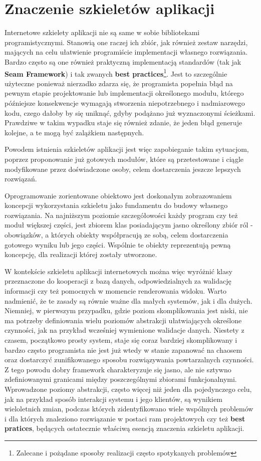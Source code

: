 \section{Znaczenie szkieletów aplikacji}
	Internetowe szkielety aplikacji nie są same w sobie bibliotekami programistycznymi. Stanowią one raczej ich zbiór, jak również zestaw narzędzi, mających na celu ułatwienie programiście implementacji własnego rozwiązania. Bardzo często są one również praktyczną implementacją standardów (tak jak \textbf{Seam Framework}) i tak zwanych \textbf{best practices}\footnote{Zalecane i pożądane sposoby realizacji często spotykanych problemów}. Jest to szczególnie użyteczne ponieważ nierzadko zdarza się, że programista popełnia błąd na pewnym etapie projektowanie lub implementacji określonego modułu, którego późniejsze konsekwencje wymagają stworzenia niepotrzebnego i nadmiarowego kodu, czego dałoby by się uniknąć, gdyby podążano już wyznaczonymi ścieżkami. Prawdziwe w takim wypadku staje się również zdanie, że jeden błąd generuje kolejne, a te mogą być zalążkiem następnych.
	
	Powodem istnienia szkieletów aplikacji jest więc zapobieganie takim sytuacjom, poprzez proponowanie już gotowych modułów, które są przetestowane i ciągle modyfikowane przez doświadczone osoby, celem dostarczenia jeszcze lepszych rozwiązań\cite{art_of_java_web_dev}.
	
	Oprogramowanie zorientowane obiektowo jest doskonałym zobrazowaniem koncepcji wykorzystania szkieletu jako fundamentu do budowy własnego rozwiązania. Na najniższym poziomie szczegółowości każdy program czy też moduł większej części, jest zbiorem klas posiadającym jasno określony zbiór ról - obowiązków, a których obiekty współpracują ze sobą, celem dostarczenia gotowego wyniku lub jego części. Wspólnie te obiekty reprezentują pewną koncepcję, dla realizacji której zostały utworzone. 
	
	W kontekście szkieletu aplikacji internetowych można więc wyróżnić klasy przeznaczone do kooperacji z bazą danych, odpowiedzialnych za walidację informacji czy też pomocnych w momencie renderowania widoku. Warto nadmienić, że te zasady są równie ważne dla małych systemów, jak i dla dużych. Niemniej, w pierwszym przypadku, gdzie poziom skomplikowania jest niski, nie ma potrzeby definiowania wielu poziomów abstrakcji ułatwiających określone czynności, jak na przykład wcześniej wymienione walidacje danych. Niestety z czasem, początkowo prosty system, staje się coraz bardziej skomplikowany i bardzo często programista nie jest już wtedy w stanie zapanować na chaosem oraz dostarczyć zunifikowanego sposobu rozwiązywania powtarzalnych czynności. Z tego powodu dobry framework charakteryzuje się jasno, ale nie sztywno zdefiniowanymi granicami między poszczególnymi zbiorami funkcjonalnymi. Wprowadzone poziomy abstrakcji, często więcej niż jeden dla pojedynczego celu, jak na przykład sposób interakcji systemu i jego klientów, są wynikiem wieloletnich zmian, podczas których zidentyfikowano wiele wspólnych problemów i dla których znaleziono rozwiązanie w postaci ram projektowych czy też \textbf{best pratices}, będących ostatecznie właściwą esencją znaczenia szkieletu aplikacji\cite{framework_design_-_a_role_modeling_approach}.
	
